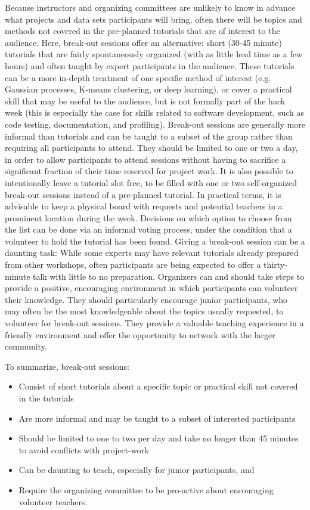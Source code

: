 \documentclass{aastex62}
\begin{document}
Because instructors and organizing committees are unlikely to know in advance what projects and data sets participants will bring, often there will be topics and methods not covered in the pre-planned tutorials that are of interest to the audience. Here, break-out sessions offer an alternative: short (30-45 minute) tutorials that are fairly spontaneously organized (with as little lead time as a few hours) and often taught by expert participants in the audience. These tutorials can be a more in-depth treatment of one specific method of interest (e.g. Gaussian processes, K-means clustering, or deep learning), or cover a practical skill that may be useful to the audience, but is not formally part of the hack week (this is especially the case for skills related to software development, such as code testing, documentation, and profiling). Break-out sessions are generally more informal than tutorials and can be taught to a subset of the group rather than requiring all participants to attend. They should be limited to one or two a day, in order to allow participants to attend sessions without having to sacrifice a significant fraction of their time reserved for project work. It is also possible to intentionally leave a tutorial slot free, to be filled with one or two self-organized break-out sessions instead of a pre-planned tutorial. In practical terms, it is advisable to keep a physical board with requests and potential teachers in a prominent location during the week. Decisions on which option to choose from the list can be done via an informal voting process, under the condition that a volunteer to hold the tutorial has been found. Giving a break-out session can be a daunting task: While some experts may have relevant tutorials already prepared from other workshops, often participants are being expected to offer a thirty-minute talk with little to no preparation. Organizers can and should take steps to provide a positive, encouraging environment in which participants can volunteer their knowledge. They should particularly encourage junior participants, who may often be the most knowledgeable about the topics usually requested, to volunteer for break-out sessions. They provide a valuable teaching experience in a friendly environment and offer the opportunity to network with the larger community.

To summarize, break-out sessions:
\begin{itemize}
\item Consist of short tutorials about a specific topic or practical skill not covered in the tutorials
\item Are more informal and may be taught to a subset of interested participants
\item Should be limited to one to two per day and take no longer than 45 minutes to avoid conflicts with project-work
\item Can be daunting to teach, especially for junior participants, and 
\item Require the organizing committee to be pro-active about encouraging volunteer teachers.
\end{itemize}
\end{document}
